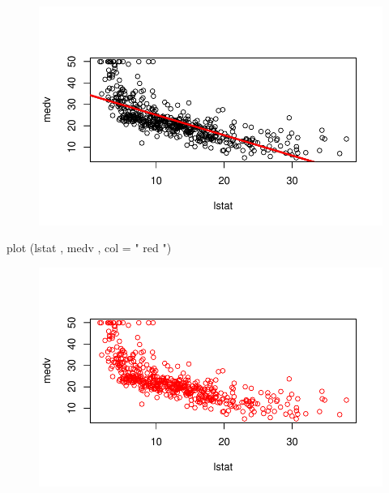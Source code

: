 \documentclass[
  letterpaper,
  DIV=11,
  numbers=noendperiod]{scrartcl}
\newenvironment{Shaded}{\begin{snugshade}}{\end{snugshade}}
\newcommand{\AttributeTok}[1]{\textcolor[rgb]{0.40,0.45,0.13}{#1}}
\newcommand{\FunctionTok}[1]{\textcolor[rgb]{0.28,0.35,0.67}{#1}}
\newcommand{\NormalTok}[1]{\textcolor[rgb]{0.00,0.23,0.31}{#1}}
\newcommand{\StringTok}[1]{\textcolor[rgb]{0.13,0.47,0.30}{#1}}
\begin{document}
\begin{figure}[H]

{\centering \includegraphics{Resumen-2---3_files/figure-pdf/unnamed-chunk-9-1.pdf}

}

\end{figure}

\begin{Shaded}
\begin{Highlighting}[]
\FunctionTok{plot}\NormalTok{ (lstat , medv , }\AttributeTok{col =} \StringTok{" red "}\NormalTok{)}
\end{Highlighting}
\end{Shaded}

\begin{figure}[H]

{\centering \includegraphics{Resumen-2---3_files/figure-pdf/unnamed-chunk-9-2.pdf}

}

\end{figure}
\end{document}
